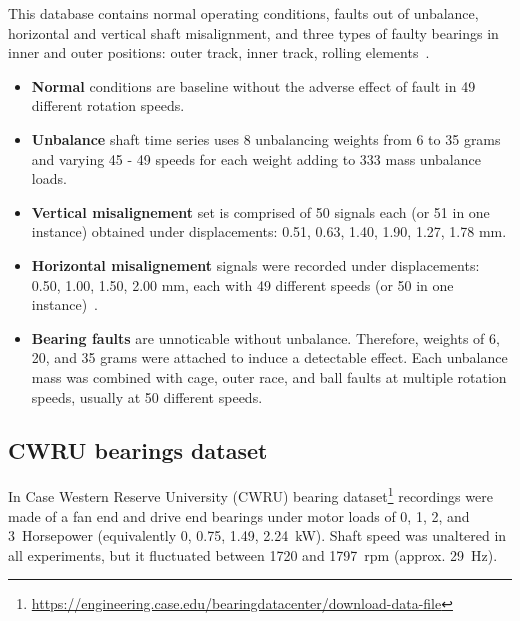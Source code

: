 This database contains normal operating conditions, faults out of unbalance, horizontal and vertical shaft misalignment, and three types of faulty bearings in inner and outer positions: outer track, inner track, rolling elements~\cite{pestana-viana_influence_2016}.
\begin{itemize}
\itemsep0pt
\item \textbf{Normal} conditions are baseline without the adverse effect of fault in 49 different rotation speeds. 
\item \textbf{Unbalance} shaft time series uses 8 unbalancing weights from 6 to 35 grams and varying 45 - 49 speeds for each weight adding to 333 mass unbalance loads. 
\item \textbf{Vertical misalignement} set is comprised of 50 signals each (or 51 in one instance) obtained under displacements: 0.51, 0.63, 1.40, 1.90, 1.27, 1.78 mm.
\item \textbf{Horizontal misalignement} signals were recorded under displacements: 0.50, 1.00, 1.50, 2.00 mm, each with 49 different speeds (or 50 in one instance)~\cite{pestana-viana_influence_2016}.
\item \textbf{Bearing faults} are unnoticable without unbalance. Therefore, weights of 6, 20, and 35 grams were attached to induce a detectable effect. Each unbalance mass was combined with cage, outer race, and ball faults at multiple rotation speeds, usually at 50 different speeds.
\end{itemize}


\subsection{CWRU bearings dataset}
In Case Western Reserve University (CWRU) bearing dataset\footnote{\url{https://engineering.case.edu/bearingdatacenter/download-data-file}} recordings were made of a fan end and drive end bearings under motor loads of 0, 1, 2, and 3~Horsepower (equivalently 0, 0.75, 1.49, 2.24~kW). Shaft speed was unaltered in all experiments, but it fluctuated between 1720 and 1797~rpm (approx. 29~Hz).

